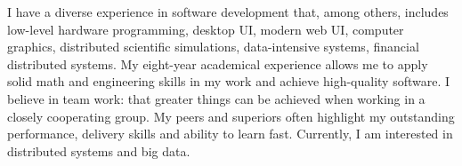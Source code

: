 

\begin{cvparagraph}
I have a diverse experience in software development that, among others, includes low-level hardware programming, desktop UI, modern web UI, computer graphics, distributed scientific simulations, data-intensive systems, financial distributed systems.
My eight-year academical experience allows me to apply solid math and engineering skills in my work and achieve high-quality software.
I believe in team work: that greater things can be achieved when working in a closely cooperating group.
My peers and superiors often highlight my outstanding performance, delivery skills and ability to learn fast.
Currently, I am interested in distributed systems and big data.
\end{cvparagraph}
